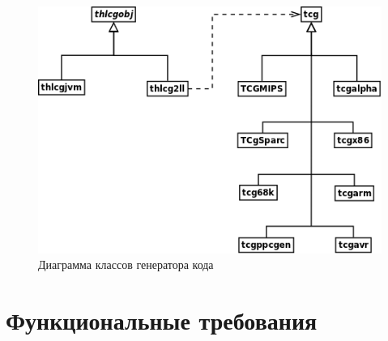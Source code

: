 \documentclass{imcs}
\begin{document}
\begin{figure}[htb]
\centering
\includegraphics{./uml/cgen.png}
\caption{Диаграмма классов генератора кода}
\end{figure}

\pagebreak

\section{Функциональные требования}
\end{document}
